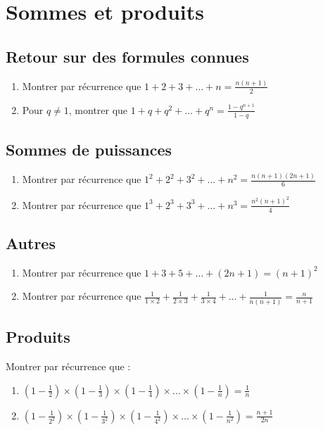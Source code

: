 \documentclass[oneside,12pt]{article}          %
\begin{document}
    

\section{Sommes et produits}


\subsection{Retour sur des formules connues}
\begin{enumerate}
    \item Montrer par récurrence que $1+2+3+\ldots+n=\frac{n(n+1)}{2}$
    \item Pour $q\neq1$, montrer que $1+q+q^2+\ldots+q^n=\frac{1-q^{n+1}}{1-q}$
\end{enumerate}



\subsection{Sommes de puissances}
\begin{enumerate}

    \item Montrer par récurrence que $1^2+2^2+3^2+...+n^2=\frac{n(n+1)(2n+1)}{6}$
    \item Montrer par récurrence que $1^3+2^3+3^3+\ldots+n^3=\frac{n^2(n+1)^2}{4}$
\end{enumerate}



\subsection{Autres}
\begin{enumerate}
    \item Montrer par récurrence que $1+3+5+\ldots+(2n+1)=(n+1)^2$
    \item Montrer par récurrence que $\frac{1}{1\times2}+\frac{1}{2\times3}+\frac{1}{3\times4}+\ldots+\frac{1}{n(n+1)}=\frac{n}{n+1}$
\end{enumerate}


\subsection{Produits}

Montrer par récurrence que :
\begin{enumerate}
    \item $(1-\frac{1}{2})\times(1-\frac{1}{3})\times(1-\frac{1}{4})\times\ldots\times(1-\frac{1}{n})=\frac{1}{n}$
    \item $(1-\frac{1}{2^2})\times(1-\frac{1}{3^2})\times(1-\frac{1}{4^2})\times\ldots\times(1-\frac{1}{n^2})=\frac{n+1}{2n}$
\end{enumerate}
\end{document}
